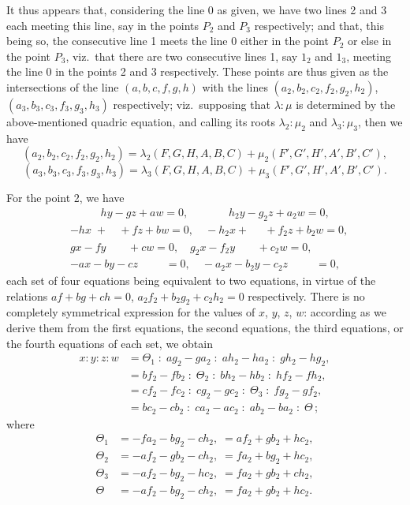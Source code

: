 \documentclass[11pt,a4paper]{article}
\begin{document}
It thus appears that, considering the line 0 as given, we have two lines 2 and 3 each meeting this line, say in the points $P_2$ and $P_3$ respectively; and that, this being so, the consecutive line 1 meets the line 0 either in the point $P_2$ or else in the point $P_3$, viz.\ that there are two consecutive lines 1, say $1_2$ and $1_3$, meeting the line 0 in the points 2 and 3 respectively. These points are thus given as the intersections of the line $(a, b, c, f, g, h)$ with the lines $(a_2, b_2, c_2, f_2, g_2, h_2)$, $(a_3, b_3, c_3, f_3, g_3, h_3)$ respectively; viz.\ supposing that $\lambda : \mu$ is determined by the above-mentioned quadric equation, and calling its roots $\lambda_2 : \mu_2$ and $\lambda_3 : \mu_3$, then we have
\[
(a_2, b_2, c_2, f_2, g_2, h_2) = \lambda_2 (F, G, H, A, B, C) + \mu_2 (F', G', H', A', B', C'),
\]
\[
(a_3, b_3, c_3, f_3, g_3, h_3) = \lambda_3 (F, G, H, A, B, C) + \mu_3 (F', G', H', A', B', C').
\]

For the point 2, we have
\[
\begin{aligned}
&\phantom{-h x.} \;\; h y - g z + a w = 0,\quad \phantom{-h_2 x.} h_2 y - g_2 z + a_2 w = 0,\\
&-h x \;+ \phantom{g y} + f z + b w = 0,\quad -h_2 x + \phantom{g_2 y} + f_2 z + b_2 w = 0,\\
& g x - f y \phantom{\;+ z} + c w = 0,\quad g_2 x - f_2 y \phantom{\;+ z} + c_2 w = 0,\\
&-a x - b y - c z \phantom{\;\;+ w} = 0,\quad -a_2 x - b_2 y - c_2 z \phantom{\;\;+ w} = 0,
\end{aligned}
\]
each set of four equations being equivalent to two equations, in virtue of the relations $a f + b g + c h = 0$, $a_2 f_2 + b_2 g_2 + c_2 h_2 = 0$ respectively. There is no completely symmetrical expression for the values of $x$, $y$, $z$, $w$: according as we derive them from the first equations, the second equations, the third equations, or the fourth equations of each set, we obtain
\[
\begin{aligned}
x : y : z : w &= \Theta_1 \;:\; a g_2 - g a_2 \;:\; a h_2 - h a_2 \;:\; g h_2 - h g_2,\\
&= b f_2 - f b_2 \;:\; \Theta_2 \;:\; b h_2 - h b_2 \;:\; h f_2 - f h_2,\\
&= c f_2 - f c_2 \;:\; c g_2 - g c_2 \;:\; \Theta_3 \;:\; f g_2 - g f_2,\\
&= b c_2 - c b_2 \;:\; c a_2 - a c_2 \;:\; a b_2 - b a_2 \;:\; \Theta\,;
\end{aligned}
\]
where
\[
\begin{aligned}
\Theta_1 &= -f a_2 - b g_2 - c h_2,\; = a f_2 + g b_2 + h c_2,\\
\Theta_2 &= -a f_2 - g b_2 - c h_2,\; = f a_2 + b g_2 + h c_2,\\
\Theta_3 &= -a f_2 - b g_2 - h c_2,\; = f a_2 + g b_2 + c h_2,\\
\Theta &= -a f_2 - b g_2 - c h_2,\; = f a_2 + g b_2 + h c_2.
\end{aligned}
\]
\end{document}
